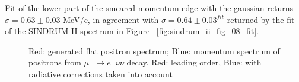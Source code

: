 Fit of the lower part of the smeared momentum edge with the gaussian returns
$\sigma = 0.63 \pm 0.03$ MeV/c, in agreement with $\sigma = 0.64 \pm 0.03^{fit}$
returned by the fit of the SINDRUM-II spectrum in Figure ~\ref{fig:sindrum_ii_fig_08_fit}.

\begin{figure} 
\caption{
  \label{fig:sindrum_ii_michel_calibration}
  Red: generated flat positron spectrum;
  Blue: momentum spectrum of positrons from $\mu^+ \rightarrow e^+ \nu \bar{\nu}$
  decay. Red: leading order, Blue: with radiative corrections taken into account
}
\end{figure}

